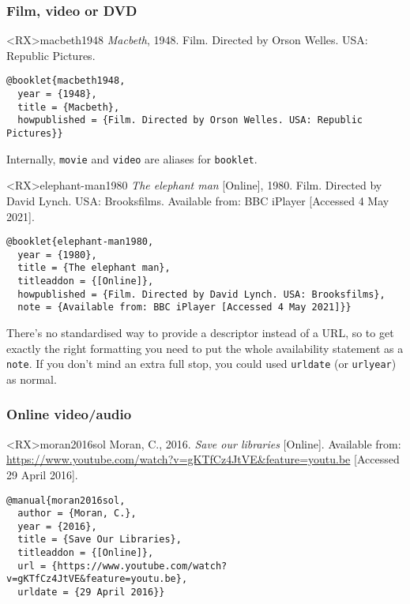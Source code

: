 \documentclass[10pt,a4paper]{article}
\newenvironment{info}{%
  \begin{list}{\makebox[2em][c]{\faInfoCircle}}{%
    \setlength{\leftmargin}{2em}
    \setlength{\labelwidth}{2em}
    \setlength{\labelsep}{0pt}}
}{\end{list}}
\newenvironment{hacks}{%
  \begin{list}{\makebox[2em][c]{\faWrench}}{%
    \setlength{\leftmargin}{2em}
    \setlength{\labelwidth}{2em}
    \setlength{\labelsep}{0pt}}
}{\end{list}}
\begin{document}
\subsubsection*{Film, video or DVD}

\begin{bibexbox}<RX>{macbeth1948}
  \emph{Macbeth}, 1948. Film. Directed by Orson Welles. USA: Republic Pictures.
  \tcblower
\begin{Verbatim}
@booklet{macbeth1948,
  year = {1948},
  title = {Macbeth},
  howpublished = {Film. Directed by Orson Welles. USA: Republic Pictures}}
\end{Verbatim}
\end{bibexbox}

\begin{info}\item
Internally, \texttt{movie} and \texttt{video} are aliases for \texttt{booklet}.
\end{info}

\begin{bibexbox}<RX>{elephant-man1980}
  \emph{The elephant man} [Online], 1980. Film. Directed by David Lynch. USA: Brooksfilms. Available from: BBC iPlayer [Accessed 4 May 2021].
  \tcblower
\begin{Verbatim}
@booklet{elephant-man1980,
  year = {1980},
  title = {The elephant man},
  titleaddon = {[Online]},
  howpublished = {Film. Directed by David Lynch. USA: Brooksfilms},
  note = {Available from: BBC iPlayer [Accessed 4 May 2021]}}
\end{Verbatim}
\end{bibexbox}

\begin{hacks}\item
  There's no standardised way to provide a descriptor instead of a URL,
  so to get exactly the right formatting you need to put the whole
  availability statement as a \texttt{note}. If you don't mind an extra
  full stop, you could used \texttt{urldate} (or \texttt{urlyear}) as normal.
\end{hacks}

\subsubsection*{Online video\slash audio}

\begin{bibexbox}<RX>{moran2016sol}
  Moran, C., 2016. \emph{Save our libraries} [Online]. Available from: \url{https://www.youtube.com/watch?v=gKTfCz4JtVE&feature=youtu.be} [Accessed 29 April 2016].
  \tcblower
\begin{Verbatim}
@manual{moran2016sol,
  author = {Moran, C.},
  year = {2016},
  title = {Save Our Libraries},
  titleaddon = {[Online]},
  url = {https://www.youtube.com/watch?v=gKTfCz4JtVE&feature=youtu.be},
  urldate = {29 April 2016}}
\end{Verbatim}
\end{bibexbox}
\end{document}
